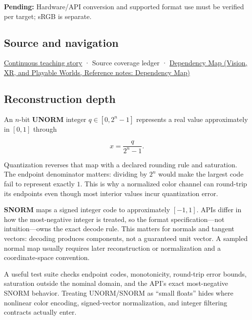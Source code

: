 \textbf{Pending:} Hardware/API conversion and supported format use must be verified per target; sRGB is separate.

\subsection{Source and navigation}\label{appendix-b2402c453dac-source-and-navigation}

\hyperref[01-foundations-i-ch001-choosing-what-information-to-keep]{Continuous teaching story} · {Source coverage ledger} · \href{../07-Vision-XR-and-Playable-Worlds/main.pdf\#nameddest=appendix-4ad47bdd269a}{Dependency Map (Vision, XR, and Playable Worlds, Reference notes: Dependency Map)}

\subsection{Reconstruction depth}\label{appendix-b2402c453dac-reconstruction-depth}

An \(n\)-bit \textbf{UNORM} integer \(q\in[0,2^n-1]\) represents a real value approximately in \([0,1]\) through

\[
x = \frac{q}{2^n-1}.
\]

Quantization reverses that map with a declared rounding rule and saturation. The endpoint denominator matters: dividing by \(2^n\) would make the largest code fail to represent exactly \(1\). This is why a normalized color channel can round-trip its endpoints even though most interior values incur quantization error.

\textbf{SNORM} maps a signed integer code to approximately \([-1,1]\). APIs differ in how the most-negative integer is treated, so the format specification---not intuition---owns the exact decode rule. This matters for normals and tangent vectors: decoding produces components, not a guaranteed unit vector. A sampled normal map usually requires later reconstruction or normalization and a coordinate-space convention.

A useful test suite checks endpoint codes, monotonicity, round-trip error bounds, saturation outside the nominal domain, and the API's exact most-negative SNORM behavior. Treating UNORM/SNORM as ``small floats'' hides where nonlinear color encoding, signed-vector normalization, and integer filtering contracts actually enter.
